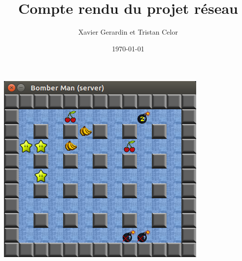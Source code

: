 \documentclass[12pt]{article}
\title{Compte rendu du projet réseau}
\author{Xavier Gerardin et Tristan Celor}
\date{\today{}}
\begin{document}
    \maketitle

    \begin{center}
        \includegraphics[scale=0.8]{image_jeu.png}
    \end{center}

    \clearpage

    \tableofcontents
    \clearpage
\end{document}
